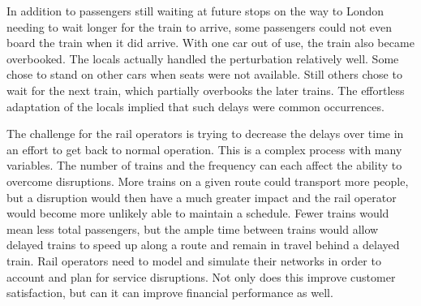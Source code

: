 In addition to passengers still waiting at future stops on the way to London
needing to wait longer for the train to arrive, some passengers could not even
board the train when it did arrive.  With one car out of use, the train also
became overbooked.  The locals actually handled the perturbation relatively
well.  Some chose to stand on other cars when seats were not available.  Still
others chose to wait for the next train, which partially overbooks the later
trains.  The effortless adaptation of the locals implied that such delays were
common occurrences.

The challenge for the rail operators is trying to decrease the delays over time
in an effort to get back to normal operation.  This is a complex process with
many variables.  The number of trains and the frequency can each affect the
ability to overcome disruptions.  More trains on a given route could transport
more people, but a disruption would then have a much greater impact and the rail
operator would become more unlikely able to maintain a schedule.  Fewer trains
would mean less total passengers, but the ample time between trains would allow
delayed trains to speed up along a route and remain in travel behind a delayed
train. Rail operators need to model and simulate their networks in order to
account and plan for service disruptions.  Not only does this improve customer
satisfaction, but can it can improve financial performance as well.